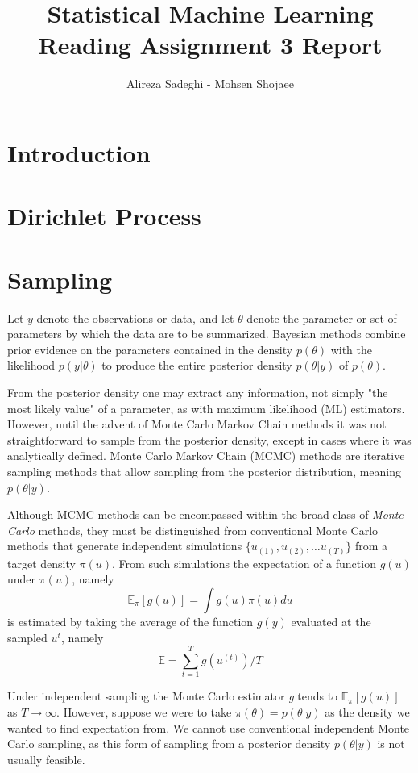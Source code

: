 \documentclass{article}
\title{Statistical Machine Learning \\ Reading Assignment 3 Report}
\author{Alireza Sadeghi - Mohsen Shojaee}
\begin{document}
\maketitle
    
\section{Introduction}

\section{Dirichlet Process}

\section{Sampling}

Let $y$ denote the observations or data, and let $\theta$ denote the parameter or set of parameters by which the data are to be summarized. Bayesian methods combine prior evidence on the parameters contained in the density $p(\theta)$ with the likelihood $p(y|\theta)$ to produce the entire posterior density $p(\theta|y)$ of $p(\theta)$.

From the posterior density one may extract any information, not simply "the most likely value" of a parameter, as with maximum likelihood (ML) estimators. However, until the advent of Monte Carlo Markov Chain methods it was not straightforward to sample from the posterior density, except in cases where it was analytically defined. Monte Carlo Markov Chain (MCMC) methods are iterative sampling methods that allow sampling from the posterior distribution, meaning $p(\theta|y)$.

Although MCMC methods can be encompassed within the broad class of \textit{Monte Carlo} methods, they must be distinguished from conventional Monte Carlo methods that generate independent simulations $\{ u_(1), u_(2), \ldots u_(T) \}$ from a target density $\pi(u)$. From such simulations the expectation of a function $g(u)$ under $\pi(u)$, namely 
    $$ \mathbb{E}_{\pi}[g(u)] = \int{g(u)\pi(u)du}$$ 
    is estimated by taking the average of the function $g(y)$ evaluated at the sampled $u^{t}$, namely 
    $$ \mathbb{E} = \sum_{t=1}^{T} g(u^{(t)})/T $$

Under independent sampling the Monte Carlo estimator \textit{g} tends to $\mathbb{E}_{\pi}[g(u)]$ as $T \rightarrow \infty$.
However, suppose we were to take $\pi(\theta) = p(\theta|y)$ as the density we wanted to find expectation from. We cannot use conventional independent Monte Carlo sampling, as this form of sampling from a posterior density $p(\theta|y)$ is not usually feasible.
\end{document}
